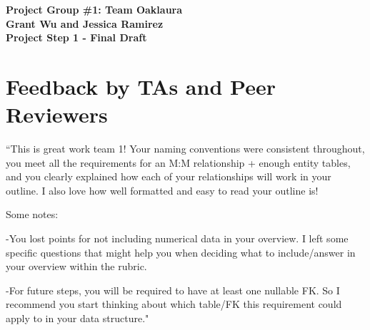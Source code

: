 \documentclass{article}
\begin{document}
\begin{center}
\large\textcolor{primarycolor}{\textbf{Project Group \#1: Team Oaklaura}}\\[0.3cm]
\large\textbf{Grant Wu and Jessica Ramirez}\\[0.3cm]
\huge\textbf{Project Step 1 - Final Draft}\\[1.25cm]
\end{center}

\section{Feedback by TAs and Peer Reviewers}

\begin{tcolorbox}[colback=secondarycolor, colframe=primarycolor, title=\textbf{TA Review - Madelyn Lazar}]
``This is great work team 1! Your naming conventions were consistent throughout, you meet all the requirements for an M:M relationship + enough entity tables, and you clearly explained how each of your relationships will work in your outline. I also love how well formatted and easy to read your outline is!

\vspace{0.2cm}

Some notes:

\vspace{0.2cm}

-You lost points for not including numerical data in your overview. I left some specific questions that might help you when deciding what to include/answer in your overview within the rubric.

\vspace{0.2cm}

-For future steps, you will be required to have at least one nullable FK. So I recommend you start thinking about which table/FK this requirement could apply to in your data structure."

\vspace{0.2cm}
\end{tcolorbox}

\vspace{0.5cm}
\end{document}
